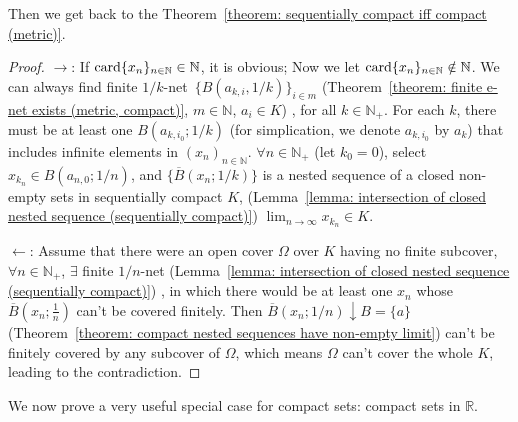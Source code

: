 \documentclass[openany]{book}
\begin{document}
Then we get back to the Theorem~\ref{theorem: sequentially compact iff compact (metric)}. 
\begin{proof}

	$\to$: 
	If $\operatorname{card} \{x_n\}_{n \in \mathbb N} \in \mathbb N$, it is obvious; 
	Now we let $\operatorname{card} \{x_n\}_{n \in \mathbb N} \notin \mathbb N$. 
	We can always find finite $1/k$-net~$\{B(a_{k, i}, 1/k)\}_{i \in m}$
		(Theorem~\ref{theorem: finite e-net exists (metric, compact)}, 
			$m \in \mathbb N$, $a_i \in K$)%
	, for all $k \in \mathbb N_+$. 
	For each $k$, there must be at least one $B(a_{k, i_0}; 1/k)$
		(for simplication, we denote $a_{k, i_0}$ by $a_k$)
	that includes infinite elements in $(x_n)_{n \in \mathbb N}$. 
	$\forall n \in \mathbb N_+$
		(let $k_0 = 0$), 
	select $x_{k_n} \in B(a_{n, 0}; 1/n)$, and $\{\overline B(x_n; 1/k)\}$ is a nested sequence of a closed non-empty sets in sequentially compact $K$,
		(Lemma~\ref{lemma: intersection of closed nested sequence (sequentially compact)})
	$\lim_{n\to \infty} x_{k_n} \in K$.
	
	$\gets$: 
	Assume that there were an open cover $\varOmega$ over $K$ having no finite subcover, $\forall n \in \mathbb N_+$, $\exists$ finite $1/n$-net 
		(Lemma~\ref{lemma: intersection of closed nested sequence (sequentially compact)})%
	, in which there would be at least one $x_n$ whose $\overline B(x_n;\frac{1}{n})$ can't be covered finitely. 
	Then $\overline B(x_n; 1/n) \downarrow B = \{a\}$ 
		(Theorem~\ref{theorem: compact nested sequences have non-empty limit})
	can't be finitely covered by any subcover of $\varOmega$, 
	which means $\varOmega$ can't cover the whole $K$, leading to the contradiction.
\end{proof}

We now prove a very useful special case for compact sets: compact sets in $\mathbb R$.
\end{document}
